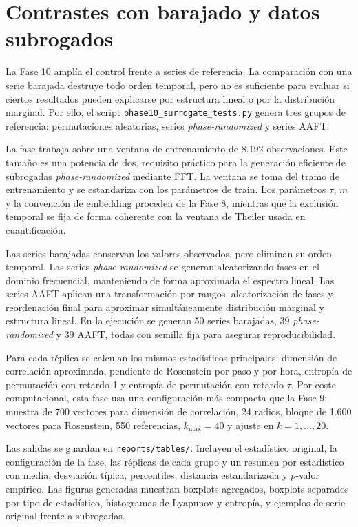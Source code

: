 \section{Contrastes con barajado y datos subrogados}\label{sec:contrastes-barajado}

La Fase 10 amplía el control frente a series de referencia. La comparación con una serie barajada destruye todo orden temporal, pero no es suficiente para evaluar si ciertos resultados pueden explicarse por estructura lineal o por la distribución marginal. Por ello, el script \texttt{phase10\_\allowbreak surrogate\_\allowbreak tests.py} genera tres grupos de referencia: permutaciones aleatorias, series \textit{phase-randomized} y series AAFT.

La fase trabaja sobre una ventana de entrenamiento de 8.192 observaciones. Este tamaño es una potencia de dos, requisito práctico para la generación eficiente de subrogadas \textit{phase-randomized} mediante FFT. La ventana se toma del tramo de entrenamiento y se estandariza con los parámetros de train. Los parámetros \(\tau\), \(m\) y la convención de embedding proceden de la Fase 8, mientras que la exclusión temporal se fija de forma coherente con la ventana de Theiler usada en cuantificación.

Las series barajadas conservan los valores observados, pero eliminan su orden temporal. Las series \textit{phase-randomized} se generan aleatorizando fases en el dominio frecuencial, manteniendo de forma aproximada el espectro lineal. Las series AAFT aplican una transformación por rangos, aleatorización de fases y reordenación final para aproximar simultáneamente distribución marginal y estructura lineal. En la ejecución se generan 50 series barajadas, 39 \textit{phase-randomized} y 39 AAFT, todas con semilla fija para asegurar reproducibilidad.

Para cada réplica se calculan los mismos estadísticos principales: dimensión de correlación aproximada, pendiente de Rosenstein por paso y por hora, entropía de permutación con retardo 1 y entropía de permutación con retardo \(\tau\). Por coste computacional, esta fase usa una configuración más compacta que la Fase 9: muestra de 700 vectores para dimensión de correlación, 24 radios, bloque de 1.600 vectores para Rosenstein, 550 referencias, \(k_{\max}=40\) y ajuste en \(k=1,\ldots,20\).

Las salidas se guardan en \texttt{reports/\allowbreak tables/}. Incluyen el estadístico original, la configuración de la fase, las réplicas de cada grupo y un resumen por estadístico con media, desviación típica, percentiles, distancia estandarizada y \(p\)-valor empírico. Las figuras generadas muestran boxplots agregados, boxplots separados por tipo de estadístico, histogramas de Lyapunov y entropía, y ejemplos de serie original frente a subrogadas.


